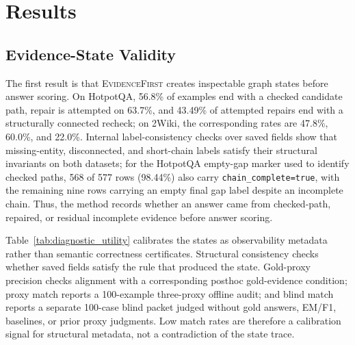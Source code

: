 \documentclass[runningheads,a4paper]{llncs}
\newcommand{\sys}{\textsc{EvidenceFirst}\xspace}
\begin{document}
\section{Results}
\label{sec:results}

\subsection{Evidence-State Validity}

The first result is that \sys creates inspectable graph states before answer
scoring. On HotpotQA, 56.8\% of examples end with a checked candidate path,
repair is attempted on 63.7\%, and 43.49\% of attempted repairs end with a
structurally connected recheck; on 2Wiki, the corresponding rates are 47.8\%,
60.0\%, and 22.0\%. Internal label-consistency checks over saved fields show
that missing-entity, disconnected, and short-chain labels satisfy their
structural invariants on both datasets; for the HotpotQA empty-gap marker used
to identify checked paths, 568 of 577 rows (98.44\%) also carry
\texttt{chain\_complete=true}, with the remaining nine rows carrying an empty
final gap label despite an incomplete chain.
Thus, the method records whether an answer came from checked-path, repaired, or
residual incomplete evidence before answer scoring.

Table~\ref{tab:diagnostic_utility} calibrates the states as observability
metadata rather than semantic correctness certificates. Structural consistency
checks whether saved fields satisfy the rule that produced the state.
Gold-proxy precision checks alignment with a corresponding posthoc
gold-evidence condition; proxy match reports a 100-example three-proxy offline
audit; and blind match reports a separate 100-case blind packet judged without
gold answers, EM/F1, baselines, or prior proxy judgments. Low match rates are
therefore a calibration signal for structural metadata, not a contradiction of
the state trace.

\begin{table}[!htbp]
\centering
\caption{2Wiki structural audit-state analysis. Structural consistency is
computed over all 500 saved examples; proxy match is from the 100-row offline
proxy plausibility audit; blind match is from a separate 100-case isolated
blind audit packet.}
\label{tab:diagnostic_utility}
\scriptsize
\setlength{\tabcolsep}{3.0pt}
\end{table}
\end{document}

